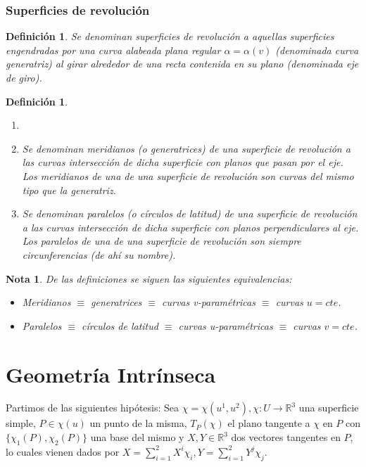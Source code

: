 \documentclass[twoside]{article}
\newtheorem{defi}[theorem]{Definición}
\newtheorem{nota}[theorem]{Nota}
\numberwithin{equation}{section}
\newcommand{\R}{\mathbb{R}}
\providecommand{\func}[2]{\colon{#1}\longrightarrow{#2}}
\begin{document}
\subsubsection{Superficies de revolución}

\begin{defi} Se denominan {\em superficies de revoluci\'on} a aquellas superficies engendradas por una curva alabeada plana regular {\bf $\alpha = \alpha(v)$} (denominada curva generatriz) al girar alrededor de una recta contenida en su plano (denominada eje de giro).
\end{defi}
\newpage
\begin{defi} 
\begin{enumerate}
\item[]
\item [a)] Se denominan {\em meridianos} (o generatrices) de una superficie de revoluci\'on a las curvas intersecci\'on de dicha superficie con planos
que pasan por el eje. Los meridianos de una de una superficie de revoluci\'on son curvas del mismo tipo que la generatriz.

\item [b)] Se denominan {\em paralelos} (o c\'irculos de latitud) de una superficie de revoluci\'on a las curvas intersecci\'on de dicha superficie con planos perpendiculares al eje. Los paralelos de una de una superficie de revoluci\'on son siempre circunferencias (de ahí su nombre).
\end{enumerate}
\end{defi}
\begin{nota} De las definiciones se siguen las siguientes equivalencias:
\begin{itemize}
\item Meridianos $\equiv$ generatrices $\equiv$ curvas v-param\'etricas $\equiv$ curvas {\bf $u = cte$}.
\item Paralelos $\equiv$ c\'irculos de latitud $\equiv$ curvas u-param\'etricas $\equiv$ curvas {\bf $v = cte$}.
\end{itemize} 
\end{nota}

\newpage


\section{Geometría Intrínseca}
Partimos de las siguientes hipótesis: Sea $\chi=\chi(u^1,u^2), \chi\func{U}{\R^3}$ una superficie simple, $P\in\chi(u)$ un punto de la misma, $T_P(\chi)$ el plano tangente a $\chi$ en $P$ con $\{\chi_1(P),\chi_2(P)\}$ una base del mismo y $X,Y \in\R^3$ dos vectores tangentes en $P$, lo cuales vienen dados por $X=\sum_{i=1}^{2}X^i\chi_i, Y=\sum_{i=1}^{2}Y^j\chi_j$.
\end{document}
